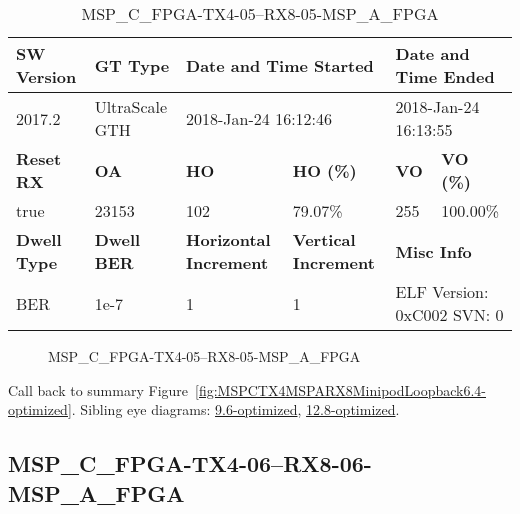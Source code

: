 \begin{table}[h]
\centering
\caption{MSP\_C\_FPGA-TX4-05--RX8-05-MSP\_A\_FPGA}
\label{tab:MSPCFPGATX405RX805MSPAFPGA6.4-optimized}
\begin{tabular}{@{}|l|l|l|l|l|l|@{}}
\toprule
\textbf{SW Version}                & \textbf{GT Type}   & \multicolumn{2}{l|}{\textbf{Date and Time Started}}            & \multicolumn{2}{l|}{\textbf{Date and Time Ended}}        \\ \midrule
2017.2                       & UltraScale GTH          & \multicolumn{2}{l|}{2018-Jan-24 16:12:46}                   & \multicolumn{2}{l|}{2018-Jan-24 16:13:55}               \\ \midrule
\textbf{Reset RX}                  & \textbf{OA} & \textbf{HO}   & \textbf{HO (\%)} & \textbf{VO} & \textbf{VO (\%)} \\ \midrule
true & 23153        & 102          & 79.07\%        & 255        & 100.00\%       \\ \midrule
\textbf{Dwell Type}                & \textbf{Dwell BER} & \textbf{Horizontal Increment} & \textbf{Vertical Increment}    & \multicolumn{2}{l|}{\textbf{Misc Info}}                  \\ \midrule
BER                            & 1e-7        & 1        & 1           & \multicolumn{2}{l|}{ELF Version: 0xC002 SVN: 0}                         \\ \bottomrule
\end{tabular}
\end{table}

\begin{figure}[h]
\caption{MSP\_C\_FPGA-TX4-05--RX8-05-MSP\_A\_FPGA} \label{fig:MSPCFPGATX405RX805MSPAFPGA6.4-optimized}
\end{figure}

Call back to summary Figure~\ref{fig:MSPCTX4MSPARX8MinipodLoopback6.4-optimized}.
Sibling eye diagrams: \hyperref[sec:MSPCFPGATX405RX805MSPAFPGA9.6-optimized]{9.6-optimized}, \hyperref[sec:MSPCFPGATX405RX805MSPAFPGA12.8-optimized]{12.8-optimized}.

\clearpage
\newpage


\subsection{MSP\_C\_FPGA-TX4-06--RX8-06-MSP\_A\_FPGA}\label{sec:MSPCFPGATX406RX806MSPAFPGA6.4-optimized}

